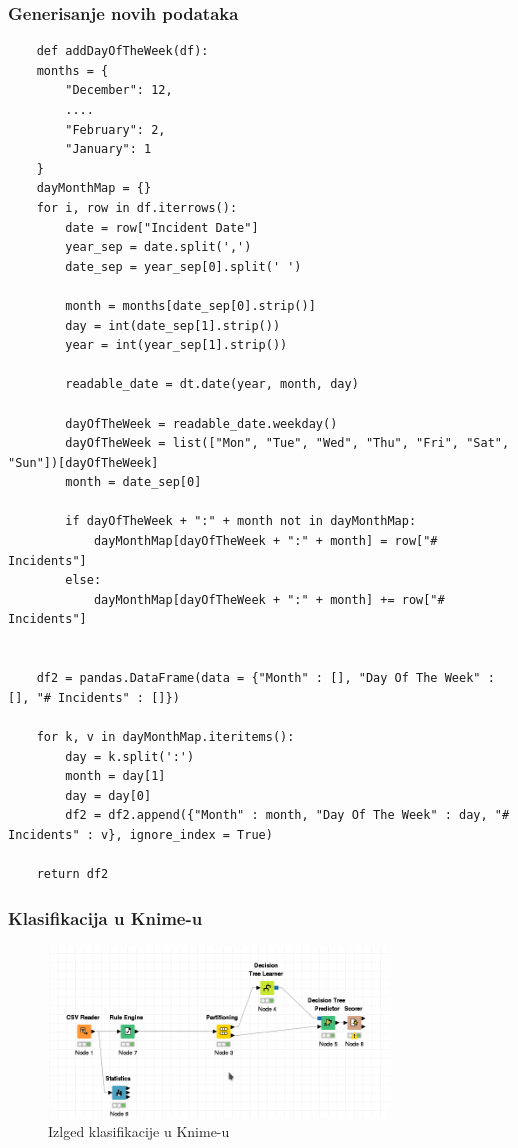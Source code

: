 \documentclass[11pt]{article} %
\begin{document}
	\subsubsection{Generisanje novih podataka}
	\begin{lstlisting}
	def addDayOfTheWeek(df):
	months = {
		"December": 12,
		....
		"February": 2,
		"January": 1
	}
	dayMonthMap = {}
	for i, row in df.iterrows():
		date = row["Incident Date"]
		year_sep = date.split(',')
		date_sep = year_sep[0].split(' ')

		month = months[date_sep[0].strip()]
		day = int(date_sep[1].strip())
		year = int(year_sep[1].strip())

		readable_date = dt.date(year, month, day)
		
		dayOfTheWeek = readable_date.weekday()
		dayOfTheWeek = list(["Mon", "Tue", "Wed", "Thu", "Fri", "Sat", "Sun"])[dayOfTheWeek]
		month = date_sep[0]
		
		if dayOfTheWeek + ":" + month not in dayMonthMap:
			dayMonthMap[dayOfTheWeek + ":" + month] = row["# Incidents"]
		else:
			dayMonthMap[dayOfTheWeek + ":" + month] += row["# Incidents"]


	df2 = pandas.DataFrame(data = {"Month" : [], "Day Of The Week" : [], "# Incidents" : []})

	for k, v in dayMonthMap.iteritems():
		day = k.split(':')
		month = day[1]
		day = day[0]
		df2 = df2.append({"Month" : month, "Day Of The Week" : day, "# Incidents" : v}, ignore_index = True)

	return df2
	\end{lstlisting}
	
	\subsubsection{Klasifikacija u Knime-u}
	
	\begin{figure}[h!]
        \includegraphics[width=0.8\textwidth]{klasifikacijaDanMesecKnime}
        \caption{Izlged klasifikacije u Knime-u}
	\end{figure}
	
\end{document}
